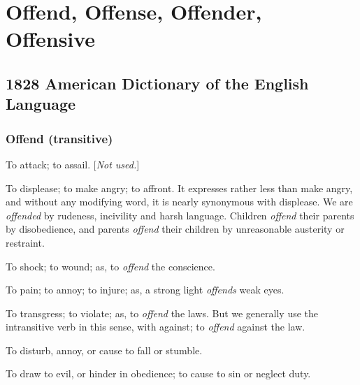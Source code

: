 \section{Offend, Offense, Offender, Offensive}
	\label{OFFENSE}
	

\subsection{1828 American Dictionary of the English Language} %
	\label{OFFENSE-1828}
	
	\subsubsection{Offend (transitive)}

		\begin{compactitem}
			\item[1] To attack; to assail. [\textit{Not used.}]
			\item[2] To displease; to make angry; to affront. It expresses rather less than make angry, and without any modifying word, it is nearly synonymous with displease. We are \textit{offended} by rudeness, incivility and harsh language. Children \textit{offend} their parents by disobedience, and parents \textit{offend} their children by unreasonable austerity or restraint.
			\item[3] To shock; to wound; as, to \textit{offend} the conscience.
			\item[4] To pain; to annoy; to injure; as, a strong light \textit{offends} weak eyes.
			\item[5] To transgress; to violate; as, to \textit{offend} the laws. But we generally use the intransitive verb in this sense, with against; to \textit{offend} against the law.
			\item[6] To disturb, annoy, or cause to fall or stumble.
			\item[7] To draw to evil, or hinder in obedience; to cause to sin or neglect duty.
		\end{compactitem}

